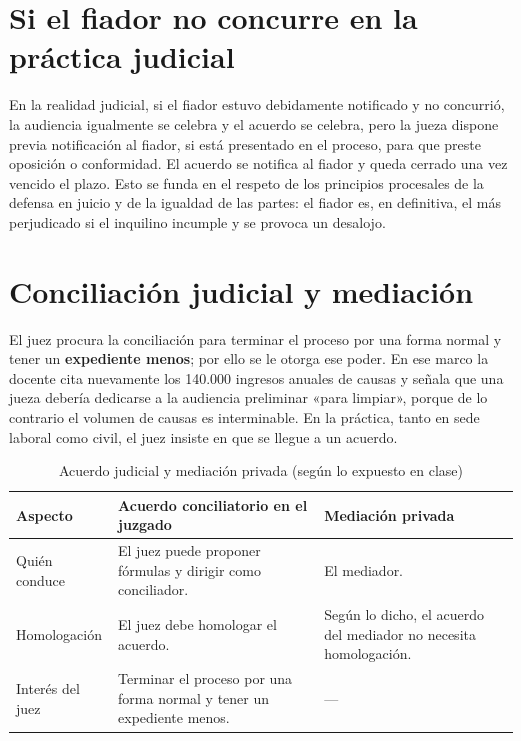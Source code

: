 \documentclass[12pt,oneside]{book}
\begin{document}
\section{Si el fiador no concurre en la práctica judicial}

En la realidad judicial, si el fiador estuvo debidamente notificado y no concurrió, la audiencia igualmente se celebra y el acuerdo se celebra, pero la jueza dispone previa notificación al fiador, si está presentado en el proceso, para que preste oposición o conformidad. El acuerdo se notifica al fiador y queda cerrado una vez vencido el plazo. Esto se funda en el respeto de los principios procesales de la defensa en juicio y de la igualdad de las partes: el fiador es, en definitiva, el más perjudicado si el inquilino incumple y se provoca un desalojo.

\section{Conciliación judicial y mediación}

El juez procura la conciliación para terminar el proceso por una forma normal y tener un \textbf{expediente menos}; por ello se le otorga ese poder. En ese marco la docente cita nuevamente los 140.000 ingresos anuales de causas y señala que una jueza debería dedicarse a la audiencia preliminar «para limpiar», porque de lo contrario el volumen de causas es interminable. En la práctica, tanto en sede laboral como civil, el juez insiste en que se llegue a un acuerdo.

\begin{table}[H]
\centering
\caption{Acuerdo judicial y mediación privada (según lo expuesto en clase)}
\small
\begin{tabularx}{\textwidth}{>{\raggedright\arraybackslash}p{3cm} >{\raggedright\arraybackslash}X >{\raggedright\arraybackslash}X}
\toprule
\textbf{Aspecto} & \textbf{Acuerdo conciliatorio en el juzgado} & \textbf{Mediación privada} \\
\midrule
Quién conduce & El juez puede proponer fórmulas y dirigir como conciliador. & El mediador. \\
Homologación & El juez debe homologar el acuerdo. & Según lo dicho, el acuerdo del mediador no necesita homologación. \\
Interés del juez & Terminar el proceso por una forma normal y tener un expediente menos. & --- \\
\bottomrule
\end{tabularx}
\end{table}
\end{document}
